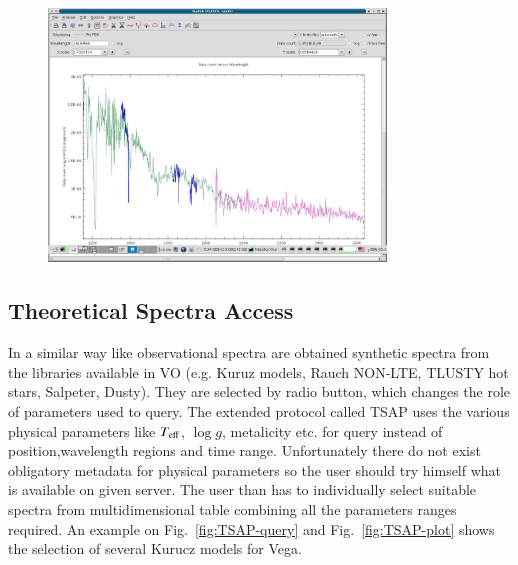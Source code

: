 \documentclass[final,authoryear,5p,times,twocolumn]{elsarticle}
\begin{document}
\begin{figure}[t]
\begin{center}
\includegraphics[width=0.8\textwidth]{iuehst2.pdf}
\caption{}
\label{fig:iuehst2}
\end{center}
\end{figure}



\subsection{ Theoretical Spectra Access}

In a similar way like observational spectra  are obtained synthetic spectra
from the libraries  available in VO (e.g. Kuruz models, Rauch NON-LTE, TLUSTY
hot stars, Salpeter, Dusty). They are selected by radio button, which  changes
the role of parameters used to query. The extended protocol called TSAP
\citep{ssap} uses  the various physical parameters like $T_{\rm eff}$, $\log g$,
metalicity etc. for query instead of position,wavelength regions and time
range. Unfortunately there do not exist obligatory metadata for physical
parameters so the user should try himself what is available on given server.
The user than has to individually select suitable spectra from multidimensional
table combining all the parameters ranges required.  An example on
Fig.~\ref{fig:TSAP-query} and Fig.~\ref{fig:TSAP-plot} shows the selection of
several Kurucz models for Vega.
\end{document}

